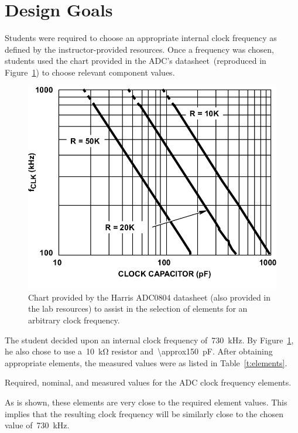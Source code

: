 \section{Design Goals}
Students were required to choose an appropriate internal clock frequency as
defined by the instructor-provided resources.  Once a frequency was chosen,
students used the chart provided in the ADC's datasheet~(reproduced in
Figure~\ref{f:element_chart}) to choose relevant component values.
%
\begin{figure}[H]
\centering
	\includegraphics[width=.8\textwidth]{img/shot/ADC0804.png}
	\parbox{.8\textwidth}{
	\caption[Clock frequency element selection]{Chart provided by the Harris
	ADC0804 datasheet (also provided in the lab resources) to assist in the
	selection of elements for an arbitrary clock frequency.}
	\label{f:element_chart}}
\end{figure}
%
The student decided upon an internal clock frequency of~\SI{730}{\kilo\hertz}.
By Figure~\ref{f:element_chart}, he also chose to use a~\SI{10}{\kilo\ohm}
resistor and~\SI{\approx150}{\pico\farad}.  After obtaining appropriate
elements, the measured values were as listed in Table~\ref{t:elements}.
%
\begin{table}[H]
\centering
	
	\parbox{.6\textwidth}{
	\caption[Measured element values]{Required, nominal, and measured values
	for the ADC clock frequency elements.}
	\label{t:elements}}
\end{table}
%
As is shown, these elements are very close to the required element values.
This implies that the resulting clock frequency will be similarly close to the
chosen value of~\SI{730}{\kilo\hertz}.
